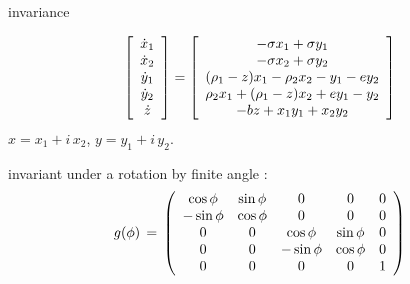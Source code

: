 \begin{frame}{ invariance}
			\begin{exampleblock}{{\cLe}}
\scriptsize		
\[
		\left[
					\begin{array}{c}
				\dot{x}_1 \\ \dot{x}_2 \\ \dot{y}_1 \\ \dot{y}_2 \\ \dot{z}
				\end{array}
		\right]
=
		\left[
					\begin{array}{c}
				 -\sigma x_1 + \sigma y_1 \\
				-\sigma x_2 + \sigma y_2 \\
                (\RerCLor-z) x_1 - \ImrCLor x_2 -y_1-e y_2 \\
                \ImrCLor x_1 + (\RerCLor-z) x_2 + e y_1- y_2 \\
				-b z + x_1 y_1 + x_2 y_2
				\end{array}
		\right]
\]
$x=x_1+i\,x_2$, $y=y_1+i\,y_2$.
			\end{exampleblock}

\begin{block}{}
invariant under a  rotation by finite angle
\gSpace:
\scriptsize		
\[
\LieEl(\gSpace) \,=\,  \left(\barr{ccccc}
  \cos \gSpace  & \sin \gSpace  & 0 & 0 & 0 \\
 -\sin \gSpace  & \cos \gSpace  & 0 & 0 & 0 \\
 0 & 0 &  \cos \gSpace & \sin \gSpace   & 0 \\
 0 & 0 & -\sin \gSpace & \cos \gSpace   & 0 \\
 0 & 0 & 0             & 0              & 1
    \earr\right)
\] %
\end{block}
\end{frame}


